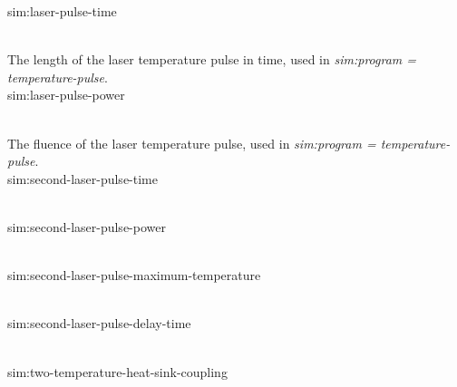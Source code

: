 {\zicf sim:laser-pulse-time}\\
   The length of the laser temperature pulse in time, used in \textit{sim:program = temperature-pulse}.\\

{\zicf sim:laser-pulse-power}\\
   The fluence of the laser temperature pulse, used in \textit{sim:program = temperature-pulse}.\\

{\zicf sim:second-laser-pulse-time}\\

{\zicf sim:second-laser-pulse-power}\\

{\zicf sim:second-laser-pulse-maximum-temperature}\\

{\zicf sim:second-laser-pulse-delay-time}\\

{\zicf sim:two-temperature-heat-sink-coupling}\\

